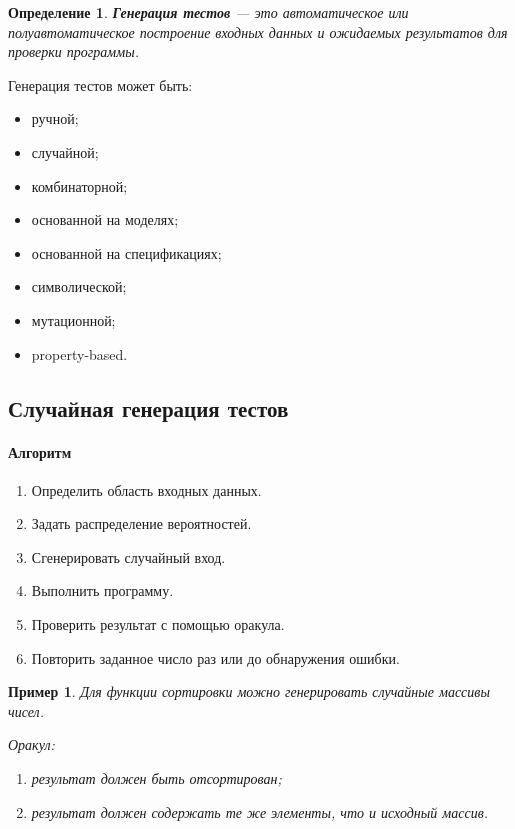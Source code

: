 \documentclass[12pt,a4paper]{article}
\newtheorem{definition}{Определение}
\newtheorem{example}{Пример}
\begin{document}
\begin{definition}
\textbf{Генерация тестов} --- это автоматическое или полуавтоматическое построение входных данных и ожидаемых результатов для проверки программы.
\end{definition}

Генерация тестов может быть:

\begin{itemize}
    \item ручной;
    \item случайной;
    \item комбинаторной;
    \item основанной на моделях;
    \item основанной на спецификациях;
    \item символической;
    \item мутационной;
    \item property-based.
\end{itemize}

\subsection{Случайная генерация тестов}

\paragraph{Алгоритм}

\begin{enumerate}
    \item Определить область входных данных.
    \item Задать распределение вероятностей.
    \item Сгенерировать случайный вход.
    \item Выполнить программу.
    \item Проверить результат с помощью оракула.
    \item Повторить заданное число раз или до обнаружения ошибки.
\end{enumerate}

\begin{example}
Для функции сортировки можно генерировать случайные массивы чисел.

Оракул:
\begin{enumerate}
    \item результат должен быть отсортирован;
    \item результат должен содержать те же элементы, что и исходный массив.
\end{enumerate}
\end{example}
\end{document}
